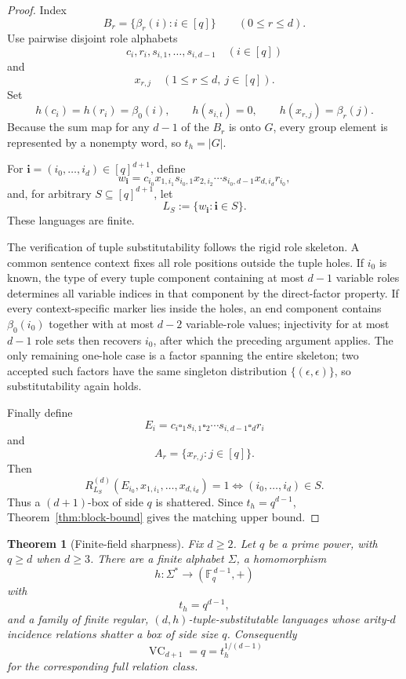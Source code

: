 \documentclass[11pt]{article}
\newtheorem{theorem}{Theorem}[section]
\newcommand{\VC}{\operatorname{VC}}
\newcommand{\blank}{\square}
\begin{document}
\begin{proof}
Index
\[
 B_r=\{\beta_r(i):i\in[q]\}\qquad(0\le r\le d).
\]
Use pairwise disjoint role alphabets
\[
 c_i,r_i,s_{i,1},\ldots,s_{i,d-1}\quad(i\in[q])
\]
and
\[
 x_{r,j}\quad(1\le r\le d,\ j\in[q]).
\]
Set
\[
 h(c_i)=h(r_i)=\beta_0(i),\qquad
 h(s_{i,t})=0,\qquad
 h(x_{r,j})=\beta_r(j).
\]
Because the sum map for any \(d-1\) of the \(B_r\) is onto \(G\), every
group element is represented by a nonempty word, so \(t_h=|G|\).

For \(\mathbf i=(i_0,\ldots,i_d)\in[q]^{d+1}\), define
\[
 w_{\mathbf i}
 =
 c_{i_0}x_{1,i_1}s_{i_0,1}x_{2,i_2}\cdots
 s_{i_0,d-1}x_{d,i_d}r_{i_0},
\]
and, for arbitrary \(S\subseteq[q]^{d+1}\), let
\[
 L_S:=\{w_{\mathbf i}:\mathbf i\in S\}.
\]
These languages are finite.

The verification of tuple substitutability follows the rigid role skeleton.
A common sentence context fixes all role positions outside the tuple holes.
If \(i_0\) is known, the type of every tuple component containing at most
\(d-1\) variable roles determines all variable indices in that component by
the direct-factor property.  If every context-specific marker lies inside
the holes, an end component contains \(\beta_0(i_0)\) together with at most
\(d-2\) variable-role values; injectivity for at most \(d-1\) role sets then
recovers \(i_0\), after which the preceding argument applies.  The only
remaining one-hole case is a factor spanning the entire skeleton; two
accepted such factors have the same singleton distribution
\(\{(\epsilon,\epsilon)\}\), so substitutability again holds.

Finally define
\[
 E_i=c_i\blank_1s_{i,1}\blank_2\cdots
 s_{i,d-1}\blank_dr_i
\]
and
\[
 A_r=\{x_{r,j}:j\in[q]\}.
\]
Then
\[
 R_{L_S}^{(d)}(E_{i_0},x_{1,i_1},\ldots,x_{d,i_d})=1
 \Longleftrightarrow
 (i_0,\ldots,i_d)\in S.
\]
Thus a \((d+1)\)-box of side \(q\) is shattered.  Since
\(t_h=q^{d-1}\), Theorem~\ref{thm:block-bound} gives the matching upper
bound.
\end{proof}


\begin{theorem}[Finite-field sharpness]\label{thm:higher-sharp}
Fix \(d\ge2\).  Let \(q\) be a prime power, with \(q\ge d\) when \(d\ge3\).
There are a finite
alphabet \(\Sigma\), a homomorphism
\[
h:\Sigma^*\to (\mathbb F_q^{\,d-1},+)
\]
with
\[
t_h=q^{d-1},
\]
and a family of finite regular, \((d,h)\)-tuple-substitutable languages whose
arity-\(d\) incidence relations shatter a box of side size \(q\). Consequently
\[
\VC_{d+1}=q=t_h^{1/(d-1)}
\]
for the corresponding full relation class.
\end{theorem}
\end{document}
